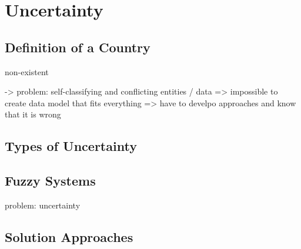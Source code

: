 
\section{Uncertainty} %
\label{sec:uncertainty}

\subsection{Definition of a Country} %
\label{sub:definition_of_a_country}

non-existent

-> problem: self-classifying and conflicting entities / data => impossible to create data model that fits everything
=> have to develpo approaches and know that it is wrong



\subsection{Types of Uncertainty} %
\label{sub:types_of_uncertainty}




\subsection{Fuzzy Systems} %
\label{sub:fuzzy_systems}

problem: uncertainty



\subsection{Solution Approaches} %
\label{sub:solution_approaches}





